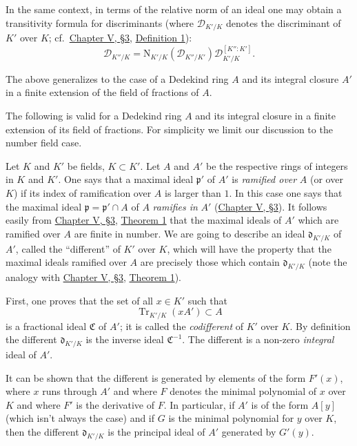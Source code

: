 In the same context, in terms of the relative norm of an ideal one may
obtain a transitivity formula for discriminants (where
$\mathcal{D}_{K'/K}$ denotes the discriminant of $K'$ over $K$; cf.\
\hyperref[sec:5.3]{Chapter V, §3}, \hyperref[def:V.3.1]{Definition 1}):
\begin{equation}
\mathcal{D}_{K''/K}
=\mathrm{N}_{K'/K}(\mathcal{D}_{K''/K'})
\mathcal{D}_{K'/K}^{[K'':K']}.
\label{eq:Supp.8}
\end{equation}

The above generalizes to the case of a Dedekind ring $A$ and its integral
closure $A'$ in a finite extension of the field of fractions of $A$.


The following is valid for a Dedekind ring $A$ and its integral closure in a
finite extension of its field of fractions. For simplicity we limit our
discussion to the number field case.

Let $K$ and $K'$ be fields, $K\subset K'$. Let $A$ and $A'$ be the respective
rings of integers in $K$ and $K'$. One says that a maximal ideal
$\mathfrak{p}'$ of $A'$ is \emph{ramified over} $A$ (or over $K$) if its
index of ramification over $A$ is larger than $1$. In this case one says
that the maximal ideal $\mathfrak{p}=\mathfrak{p}'\cap A$ of $A$
\emph{ramifies in} $A'$ (\hyperref[sec:5.3]{Chapter V, §3}). It follows easily from \hyperref[sec:5.3]{Chapter V,
§3}, \hyperref[thm:V.3.1]{Theorem 1} that the maximal ideals of $A'$ which are ramified over $A$
are finite in number. We are going to describe an ideal
$\mathfrak{d}_{K'/K}$ of $A'$, called the ``different'' of $K'$ over $K$,
which will have the property that the maximal ideals ramified over $A$ are
precisely those which contain $\mathfrak{d}_{K'/K}$ (note the analogy with
\hyperref[sec:5.3]{Chapter V, §3}, \hyperref[thm:V.3.1]{Theorem 1}).

First, one proves that the set of all $x\in K'$ such that
\begin{equation}
\operatorname{Tr}_{K'/K}(xA')\subset A
\label{eq:Supp.9}
\end{equation}
is a fractional ideal $\mathfrak{C}$ of $A'$; it is called the
\emph{codifferent} of $K'$ over $K$. By definition the different
$\mathfrak{d}_{K'/K}$ is the inverse ideal $\mathfrak{C}^{-1}$. The
different is a non-zero \emph{integral} ideal of $A'$.

It can be shown that the different is generated by elements of the form
$F'(x)$, where $x$ runs through $A'$ and where $F$ denotes the minimal
polynomial of $x$ over $K$ and where $F'$ is the derivative of $F$. In
particular, if $A'$ is of the form $A[y]$ (which isn't always the case) and
if $G$ is the minimal polynomial for $y$ over $K$, then the different
$\mathfrak{d}_{K'/K}$ is the principal ideal of $A'$ generated by $G'(y)$.

